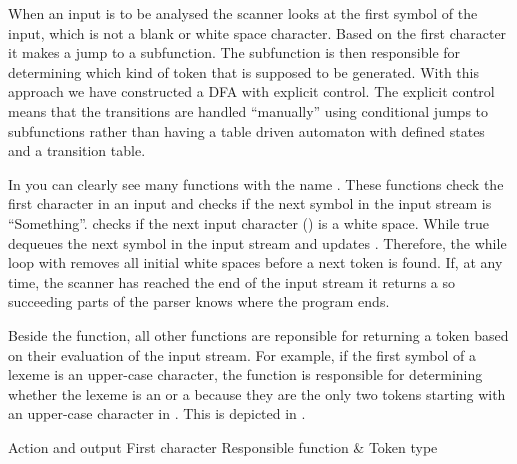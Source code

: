 When an input is to be analysed the scanner looks at the first symbol of the input, which is not a blank or white space character. Based on the first character it makes a jump to a subfunction. The subfunction is then responsible for determining which kind of token that is supposed to be generated. With this approach we have constructed a DFA with explicit control. The explicit control means that the transitions are handled ``manually'' using conditional jumps to subfunctions rather than having a table driven automaton with defined states and a transition table.

In  you can clearly see many functions with the name . These functions check the first character in an input and checks if the next symbol in the input stream is ``Something''.  checks if the next input character () is a white space. While true  dequeues the next symbol in the input stream and updates . Therefore, the while loop with  removes all initial white spaces before a next token is found. If, at any time, the scanner has reached the end of the input stream it returns a  so succeeding parts of the parser knows where the program ends.

Beside the  function, all other  functions are reponsible for returning a token based on their evaluation of the input stream.
For example, if the first symbol of a lexeme is an upper-case character, the function  is responsible for determining whether the lexeme is an  or a  because they are the only two tokens starting with an upper-case character in \productname{}. This is depicted in . 


                 		 {Action and output												}
       {First character	}{Responsible function	& Token type							}{
}


